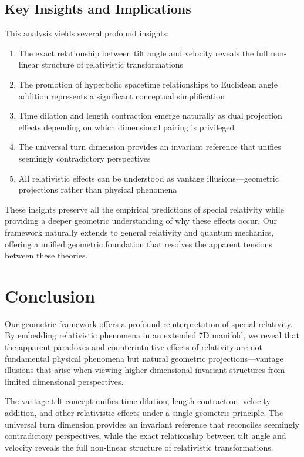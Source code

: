 \documentclass{article}
\begin{document}
\subsection{Key Insights and Implications}

This analysis yields several profound insights:

\begin{enumerate}
\item The exact relationship between tilt angle and velocity reveals the full non-linear structure of relativistic transformations
\item The promotion of hyperbolic spacetime relationships to Euclidean angle addition represents a significant conceptual simplification
\item Time dilation and length contraction emerge naturally as dual projection effects depending on which dimensional pairing is privileged
\item The universal turn dimension provides an invariant reference that unifies seemingly contradictory perspectives
\item All relativistic effects can be understood as vantage illusions—geometric projections rather than physical phenomena
\end{enumerate}

These insights preserve all the empirical predictions of special relativity while providing a deeper geometric understanding of why these effects occur. Our framework naturally extends to general relativity and quantum mechanics, offering a unified geometric foundation that resolves the apparent tensions between these theories.

\section{Conclusion}

Our geometric framework offers a profound reinterpretation of special relativity. By embedding relativistic phenomena in an extended 7D manifold, we reveal that the apparent paradoxes and counterintuitive effects of relativity are not fundamental physical phenomena but natural geometric projections—vantage illusions that arise when viewing higher-dimensional invariant structures from limited dimensional perspectives.

The vantage tilt concept unifies time dilation, length contraction, velocity addition, and other relativistic effects under a single geometric principle. The universal turn dimension provides an invariant reference that reconciles seemingly contradictory perspectives, while the exact relationship between tilt angle and velocity reveals the full non-linear structure of relativistic transformations.
\end{document}
